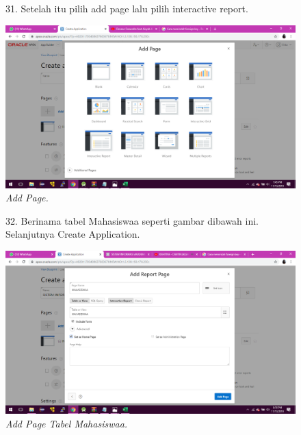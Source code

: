 \begin{enumerate}
\begin{figure}   
\item[31.] Setelah itu pilih add page lalu pilih interactive report.
    \begin{center}
    \includegraphics[scale=0.3]{figures/55.png}
    \caption{\textit{Add Page.}}
    \end{center}
    \label{gambar}
    \end{figure} 
     
\begin{figure}
\item[32.] Berinama tabel Mahasiswaa seperti gambar dibawah ini. Selanjutnya Create Application.
    \begin{center}
    \includegraphics[scale=0.3]{figures/60.png}
    \caption{\textit{Add Page Tabel Mahasiswaa.}}
    \end{center}
    \label{gambar}
    \end{figure}


\end{enumerate}
